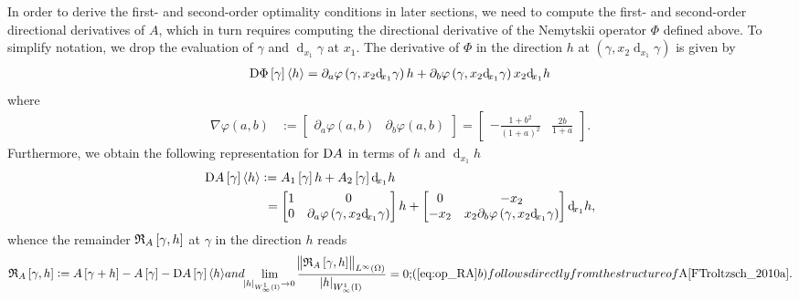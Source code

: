 \documentclass[final]{siamltex}
\begin{document}
In order to derive the first- and second-order optimality conditions in later sections, we need to compute the first- and 
second-order directional derivatives of $A$, which in turn requires computing the directional derivative of the 
Nemytskii operator $\Phi$ defined above. To simplify notation, we drop the evaluation
of $\gamma$ and ${\operatorname{d}\!}_{x_1}\gamma$ at $x_1$. The derivative of $\Phi$ in the direction $h$ at 
$(\gamma, x_2 {\operatorname{d}\!}_{x_1}\gamma)$ is given by
\begin{align*}
     \Dif\Phi\sbr{\gamma}{\langle {h} \rangle} 
                 =  \partial_a\varphi\del{\gamma, x_2 {\operatorname{d}\!}_{x_1}\gamma} h + \partial_b\varphi\del{\gamma, x_2 {\operatorname{d}\!}_{x_1}\gamma}  x_2 {\operatorname{d}\!}_{x_1}h
\end{align*}
where 
\begin{align*}
	{\nabla} \varphi(a,b) 
	    &:= \begin{bmatrix} \partial_a\varphi(a, b) & \partial_b\varphi(a,b)\end{bmatrix} 
	       = \begin{bmatrix} -\frac{1 + b^2}{(1+ a)^2} &	\frac{2 b}{1+a}
	          \end{bmatrix}    .
\end{align*}
Furthermore, we obtain the following representation for $\Dif A$ in terms of $h$ and ${\operatorname{d}\!}_{x_1} h$
\begin{align} \label{eq:op_DA}
     \Dif A\sbr{\gamma}{\langle {h} \rangle} 
       & := A_1\sbr{\gamma}h + A_2\sbr{\gamma} {\operatorname{d}\!}_{x_1}h  \nonumber \\
       & ~=  \begin{bmatrix} 1 & 0 \\ 0 & \partial_a\varphi\del{\gamma, x_2 {\operatorname{d}\!}_{x_1}\gamma} \end{bmatrix} h                                         
          + \begin{bmatrix} 0 & -x_2 \\ -x_2 & x_2 \partial_b\varphi\del{\gamma, x_2 {\operatorname{d}\!}_{x_1}\gamma} \end{bmatrix}  {\operatorname{d}\!}_{x_1}h , 
\end{align}
whence the remainder ${\mathfrak{R}}_A\sbr{\gamma, h}$ at $\gamma$ in the direction $h$ reads
\begin{subequations}\label{eq:op_RA}
	\begin{align}
		{\mathfrak{R}}_A\sbr{\gamma, h} := A\sbr{\gamma+h} - A\sbr{\gamma} - \Dif A\sbr{\gamma}{\langle {h} \rangle}
	\end{align}
and
	\begin{align}
		\lim_{{\abs{{h}}_{{W^{{1}}_{{\infty}}\del{{\text{\rm I}}}}}} \to 0} 
			\frac{{\norm{{{\mathfrak{R}}_A\sbr{\gamma, h}}}_{{L^\infty\del{{\Omega}}}}}}{{\abs{{h}}_{{W^{{1}}_{{\infty}}\del{{\text{\rm I}}}}}}} = 0 ;
	\end{align}
	(\ref{eq:op_RA}b) follows directly from the structure of $A$
        \cite[Lemma 4.12]{FTroltzsch_2010a}.  
\end{subequations}
\end{document}
